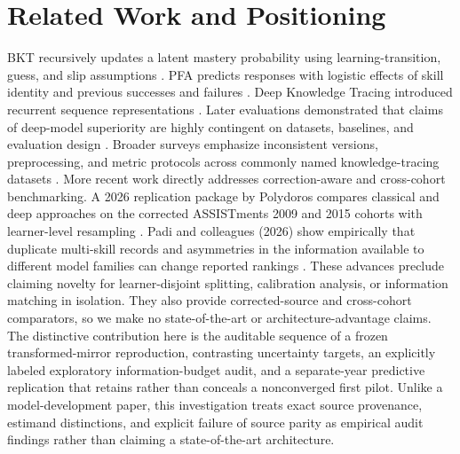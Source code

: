 \documentclass[11pt,a4paper]{article}
\begin{document}
\section{Related Work and Positioning}
BKT recursively updates a latent mastery probability using learning-transition, guess, and slip assumptions \citep{corbett1995}. PFA predicts responses with logistic effects of skill identity and previous successes and failures \citep{pavlik2009}. Deep Knowledge Tracing introduced recurrent sequence representations \citep{piech2015}. Later evaluations demonstrated that claims of deep-model superiority are highly contingent on datasets, baselines, and evaluation design \citep{gervet2020}. Broader surveys emphasize inconsistent versions, preprocessing, and metric protocols across commonly named knowledge-tracing datasets \citep{abdelrahman2023}. More recent work directly addresses correction-aware and cross-cohort benchmarking. A 2026 replication package by Polydoros compares classical and deep approaches on the corrected ASSISTments 2009 and 2015 cohorts with learner-level resampling \citep{polydoros2026}. Padi and colleagues (2026) show empirically that duplicate multi-skill records and asymmetries in the information available to different model families can change reported rankings \citep{padi2026}. These advances preclude claiming novelty for learner-disjoint splitting, calibration analysis, or information matching in isolation. They also provide corrected-source and cross-cohort comparators, so we make no state-of-the-art or architecture-advantage claims. The distinctive contribution here is the auditable sequence of a frozen transformed-mirror reproduction, contrasting uncertainty targets, an explicitly labeled exploratory information-budget audit, and a separate-year predictive replication that retains rather than conceals a nonconverged first pilot. Unlike a model-development paper, this investigation treats exact source provenance, estimand distinctions, and explicit failure of source parity as empirical audit findings rather than claiming a state-of-the-art architecture.
\end{document}
